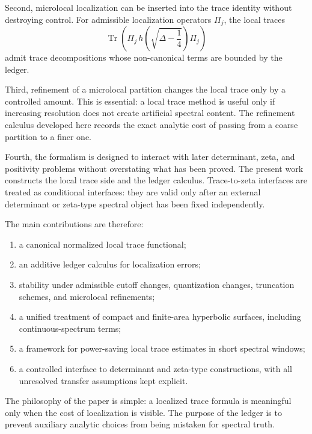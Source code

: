 Second, microlocal localization can be inserted into the trace identity without destroying control.  For admissible localization operators \(\Pi_j\), the local traces
\[
  \operatorname{Tr}\!\left(
    \Pi_j\,h\!\left(\sqrt{\Delta-\frac14}\right)\Pi_j
  \right)
\]
admit trace decompositions whose non-canonical terms are bounded by the ledger.

Third, refinement of a microlocal partition changes the local trace only by a controlled amount.  This is essential: a local trace method is useful only if increasing resolution does not create artificial spectral content.  The refinement calculus developed here records the exact analytic cost of passing from a coarse partition to a finer one.

Fourth, the formalism is designed to interact with later determinant, zeta, and positivity problems without overstating what has been proved.  The present work constructs the local trace side and the ledger calculus.  Trace-to-zeta interfaces are treated as conditional interfaces: they are valid only after an external determinant or zeta-type spectral object has been fixed independently.

The main contributions are therefore:

\begin{enumerate}
  \item a canonical normalized local trace functional;
  \item an additive ledger calculus for localization errors;
  \item stability under admissible cutoff changes, quantization changes, truncation schemes, and microlocal refinements;
  \item a unified treatment of compact and finite-area hyperbolic surfaces, including continuous-spectrum terms;
  \item a framework for power-saving local trace estimates in short spectral windows;
  \item a controlled interface to determinant and zeta-type constructions, with all unresolved transfer assumptions kept explicit.
\end{enumerate}

The philosophy of the paper is simple: a localized trace formula is meaningful only when the cost of localization is visible.  The purpose of the ledger is to prevent auxiliary analytic choices from being mistaken for spectral truth.
